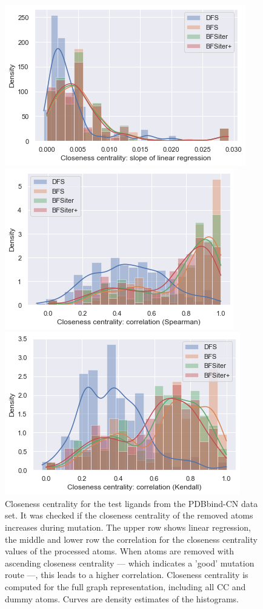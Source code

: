 \begin{figure}[H]
	
	\includegraphics{closeness_slope_all}
	
	\includegraphics{closeness_spearman}
	
	\includegraphics{closeness_kendall}\caption{Closeness centrality for the test ligands from the PDBbind-CN data set. It was checked if the closeness centrality of the removed atoms increases during mutation. The upper row shows linear regression, the middle and lower row the correlation for the closeness centrality values of the processed atoms. When atoms are removed with ascending closeness centrality --- which indicates a 'good' mutation route ---, this leads to a higher correlation.  Closeness centrality is computed for the full graph representation, including all CC and dummy atoms. Curves are density estimates of the histograms.}
	
\end{figure}


